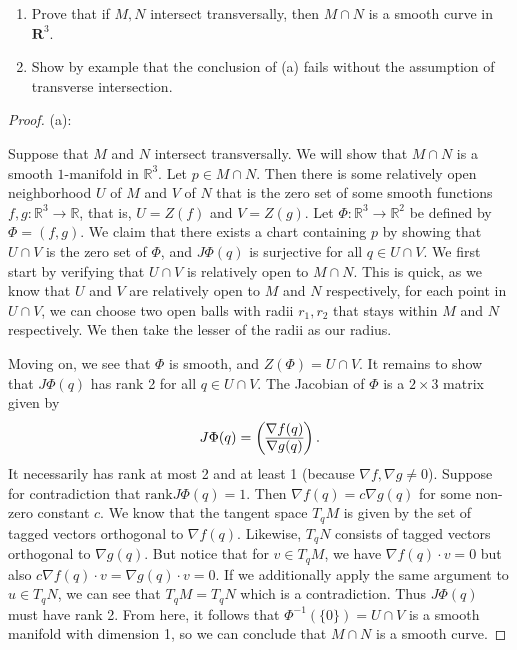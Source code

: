 \documentclass{article}
\newcommand{\R}{\mathbf{R}}
\newcommand{\rank}{\mathrm{rank}}
\theoremstyle{plain} %
\numberwithin{thm}{section} %
\theoremstyle{definition}
\begin{document}
        \begin{enumerate}[label=(\alph*)]
            \item Prove that if $M,N$ intersect transversally, then $M\cap N$ is a smooth curve in $\R^3$.
            \item Show by example that the conclusion of (a) fails without the assumption of transverse intersection.
        \end{enumerate}
        \begin{proof}
        (a):

        Suppose that \(M\) and \(N\) intersect transversally. We will show that \(M \cap N\) is a smooth \(1\)-manifold in \(\mathbb{R}^3\). Let \(p \in M \cap N\). Then there is some relatively open neighborhood \(U\) of \(M\) and \(V\) of \(N\) that is the zero set of some smooth functions \(f,g: \mathbb{R}^3 \to \mathbb{R}\), that is, \(U = Z(f)\) and \(V = Z(g)\). Let \(\Phi : \mathbb{R}^3 \to \mathbb{R}^2\) be defined by \(\Phi = (f,g)\). We claim that there exists a chart containing \(p\) by showing that \(U\cap V\) is the zero set of \(\Phi\), and \(J \Phi(q)\) is surjective for all \(q \in U \cap V\). We first start by verifying that \(U \cap V\) is relatively open to \(M \cap N\). This is quick, as we know that \(U\) and \(V\) are relatively open to \(M\) and \(N\) respectively, for each point in \(U \cap V\), we can choose two open balls with radii \(r_1,r_2\) that stays within \(M\) and \(N\) respectively. We then take the lesser of the radii as our radius.

        Moving on, we see that \(\Phi\) is smooth, and \(Z(\Phi) = U \cap V\). It remains to show that \(J \Phi (q)\) has rank 2 for all \(q \in U \cap V\). The Jacobian of \(\Phi\) is a \(2 \times 3\) matrix given by
        \[
            J \Phi (q) = \left( \begin{array}{@{}c@{}}
                \nabla f(q) \\
                \hline
                \nabla g(q) \\
            \end{array} \right).
        \]
        It necessarily has rank at most 2 and at least 1 (because \(\nabla f, \nabla g \neq 0\)). Suppose for contradiction that \(\rank J \Phi (q) = 1\). Then \(\nabla f(q) = c \nabla g(q)\) for some non-zero constant \(c\). We know that the tangent space \(T_q M\) is given by the set of tagged vectors orthogonal to \(\nabla f(q)\). Likewise, \(T_q N\) consists of tagged vectors orthogonal to \(\nabla g(q)\). But notice that for \(v \in T_q M\), we have \(\nabla f(q) \cdot v = 0\) but also \(c \nabla f(q) \cdot v = \nabla g(q) \cdot v = 0\). If we additionally apply the same argument to \(u \in T_q N\), we can see that \(T_q M = T_q N\) which is a contradiction. Thus \(J \Phi (q)\) must have rank 2. From here, it follows that \(\Phi ^{-1}(\{ 0 \}) = U \cap V\) is a smooth manifold with dimension 1, so we can conclude that \(M \cap N\) is a smooth curve.


\end{proof}
\end{document}
